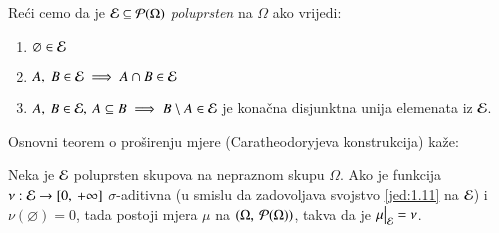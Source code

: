 \begin{defn}    \label{defn:2.10-1}
    Re\' ci cemo da je $\mathcal{E} \subseteq \mathcal{P}({\Omega})$ \emph{poluprsten} na $\Omega$ ako vrijedi:
    \begin{enumerate}[label=(\roman*)]
        \item $\varnothing \in \mathcal{E}$
        \item $A, \; B \in \mathcal{E} \implies A \cap B \in \mathcal{E}$
        \item $A, \: B \in \mathcal{E}, \: A \subseteq B \implies B \setminus A \in \mathcal{E}$ je kona\v cna disjunktna unija elemenata iz $\mathcal{E}$.
    \end{enumerate}
\end{defn}


Osnovni teorem o pro\v sirenju mjere (Caratheodoryjeva konstrukcija) ka\v ze:

\begin{tm}  \label{tm:2.11}
    Neka je $\mathcal{E}$ poluprsten skupova na nepraznom skupu $\Omega$. Ako je funkcija $\nu: \mathcal{E} \to [0, \: + \infty]$ $\sigma$-aditivna (u smislu da zadovoljava svojstvo \eqref{jed:1.11} na $\mathcal{E}$) i $\nu(\varnothing) = 0$, tada postoji mjera $\mu$ na $(\Omega, \: \mathcal{P}({\Omega}))$, takva da je $\restr{\mu}{\famE} = \nu$.
\end{tm}

